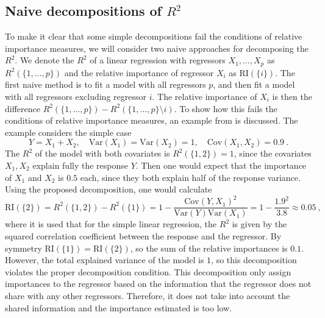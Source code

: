 \subsection{Naive decompositions of \texorpdfstring{$R^2$}{Lg}}
\label{sec:naive_decomp}
To make it clear that some simple decompositions fail the conditions of relative importance measures, we will consider two naive approaches for decomposing the $R^2$. We denote the $R^2$ of a linear regression with regressors $X_1, \dots, X_p$ as $R^2(\{1, \dots, p\})$ and the relative importance of regressor $X_i$ as $\text{RI}(\{i\})$.
\newline
\newline
The first naive method is to fit a model with all regressors $p$, and then fit a model with all regressors excluding regressor $i$. The relative importance of $X_i$ is then the difference $R^2(\{1, \dots, p\}) - R^2(\{1, \dots, p\} \setminus i)$.
To show how this fails the conditions of relative importance measures, an example from \citet{matre} is discussed. The example considers the simple case 
\begin{equation}
    Y=X_1+X_2, \quad \text{Var}(X_1) = \text{Var}(X_2)=1, \quad \text{Cov}(X_1, X_2)=0.9 \ .
\end{equation}
The $R^2$ of the model with both covariates is $R^2(\{1, 2\})=1$, since the covariates $X_1, X_2$ explain fully the response $Y$. Then one would expect that the importance of $X_1$ and $X_2$ is $0.5$ each, since they both explain half of the response variance.
Using the proposed decomposition, one would calculate
\begin{equation}
    \text{RI}(\{2\}) = R^2(\{1, 2\}) - R^2(\{1\}) = 1 - \frac{\text{Cov}(Y, X_1)^2}{\text{Var}(Y)\text{Var}(X_1)} = 1- \frac{1.9^2}{3.8} \approx 0.05 \ ,
\end{equation}
where it is used that for the simple linear regression, the $R^2$ is given by the squared correlation coefficient between the response and the regressor.
By symmetry $\text{RI}(\{1\})=\text{RI}(\{2\})$, so the sum of the relative importances is $0.1$. However, the total explained variance of the model is $1$, so this decomposition violates the proper decomposition condition.
This decomposition only assign importances to the regressor based on the information that the regressor does not share with any other regressors. Therefore, it does not take into account the shared information and the importance estimated is too low.
\newline
\newline
